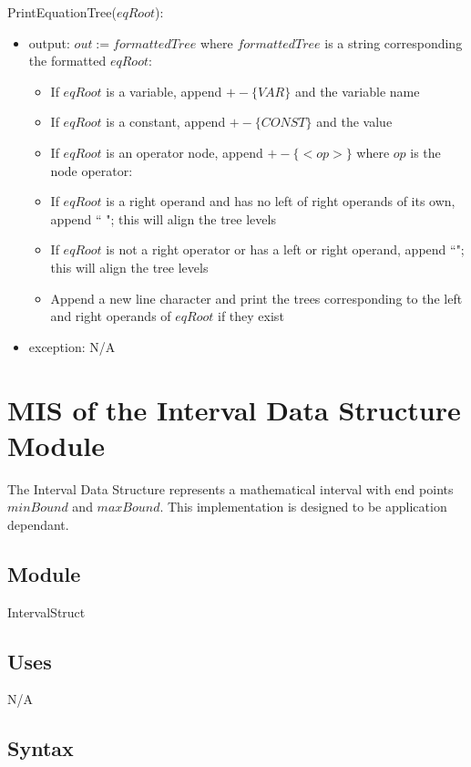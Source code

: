\documentclass[12pt, titlepage]{article}
\begin{document}
\noindent PrintEquationTree($eqRoot$):
\begin{itemize}
	\item output: $out := formattedTree$ where $formattedTree$ is a 
	string corresponding the formatted $eqRoot$:
	\begin{itemize}
		\item If $eqRoot$ is a variable, append $+- \{VAR\}$ and the variable 
		name
		\item If $eqRoot$ is a constant, append $+- \{CONST\}$ and the value
		\item If $eqRoot$ is an operator node, append $+- \{<op>\}$ where $op$ 
		is 
		the node operator:
		\item If $eqRoot$ is a right operand and has no left of right 
		operands of its own, append ``   "; this will align the tree levels
		\item If $eqRoot$ is not a right operator or has a left or right 
		operand, append ``\textbar ";  this will align the tree levels
		\item Append a new line character and print the trees corresponding 
		to the left and right operands of $eqRoot$ if they exist
	\end{itemize}
	\item exception: N/A
\end{itemize}

\newpage

\section{MIS of the Interval Data Structure Module} 
\label{Module_intervaldatastructure}
The Interval Data Structure represents a mathematical interval with end points 
$minBound$ and $maxBound$. This implementation is designed to be application 
dependant.

\subsection{Module}

IntervalStruct

\subsection{Uses}

N/A

\subsection{Syntax}
\end{document}
